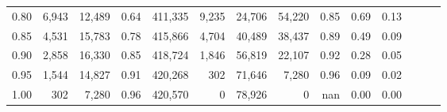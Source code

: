 \begin{tabular}{rrrrrrrrrrrrrr}
0.80 &   6,943 &  12,489 &  0.64 &  411,335 &    9,235 &  24,706 &  54,220 &  0.85 &  0.69 &      0.13 \\
0.85 &   4,531 &  15,783 &  0.78 &  415,866 &    4,704 &  40,489 &  38,437 &  0.89 &  0.49 &      0.09 \\
0.90 &   2,858 &  16,330 &  0.85 &  418,724 &    1,846 &  56,819 &  22,107 &  0.92 &  0.28 &      0.05 \\
0.95 &   1,544 &  14,827 &  0.91 &  420,268 &      302 &  71,646 &   7,280 &  0.96 &  0.09 &      0.02 \\
1.00 &     302 &   7,280 &  0.96 &  420,570 &        0 &  78,926 &       0 &   nan &  0.00 &      0.00 \\
\bottomrule
\end{tabular}
